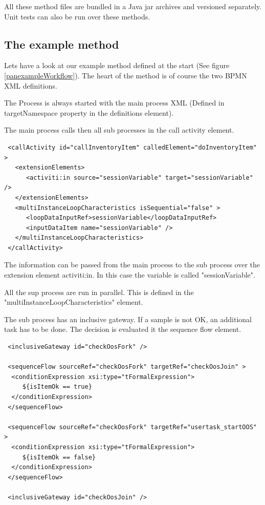 \documentclass[paper=a4,twoside=false,BCOR=0mm,DIV=calc,fontsize=12pt]{scrartcl}
\begin{document}
All these method files are bundled in a Java jar archives and versioned separately. Unit tests can also be run over these methods.

\subsection{The example method}
Lets have a look at our example method defined at the start (See figure \ref{panexampleWorkflow}). The heart of the method is of course the two BPMN XML definitions. 

The Process is always started with the main process XML (Defined in targetNamespace property in the definitions element).

The main process calls then all sub processes in the call activity element.
\begin{verbatim}
 <callActivity id="callInventoryItem" calledElement="doInventoryItem" >
   <extensionElements>
      <activiti:in source="sessionVariable" target="sessionVariable" />
   </extensionElements> 
   <multiInstanceLoopCharacteristics isSequential="false" >
      <loopDataInputRef>sessionVariable</loopDataInputRef>
      <inputDataItem name="sessionVariable" />
   </multiInstanceLoopCharacteristics> 
 </callActivity>
\end{verbatim}
The information can be passed from the main process to the sub process over the extension element activiti:in. In this case the variable is called "sessionVariable". 

All the sup process are run in parallel. This is defined in the "multiInstanceLoopCharacteristics" element.

The sub process has an inclusive gateway. If a sample is not OK, an additional task has to be done.
The decision is evaluated it the sequence flow element.
\begin{verbatim}
 <inclusiveGateway id="checkOosFork" />
        
 <sequenceFlow sourceRef="checkOosFork" targetRef="checkOosJoin" >
  <conditionExpression xsi:type="tFormalExpression">
     ${isItemOk == true}
  </conditionExpression>
 </sequenceFlow>
	    
 <sequenceFlow sourceRef="checkOosFork" targetRef="usertask_startOOS" >
  <conditionExpression xsi:type="tFormalExpression">
     ${isItemOk == false}
  </conditionExpression>
 </sequenceFlow>
 
 <inclusiveGateway id="checkOosJoin" />
\end{verbatim}
\end{document}
